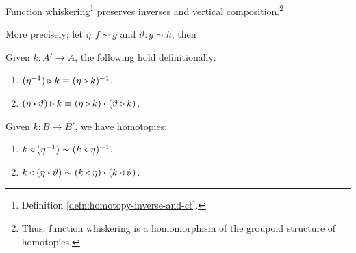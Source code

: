 \begin{prop}\label{prop:whiskering-distributivity}
    Function whiskering\footnote{Definition \ref{defn:homotopy-inverse-and-ct}.} preserves inverses and vertical composition.\footnote{Thus, function whiskering is a homomorphism of the groupoid structure of homotopies.}

    More precisely; let\/ $\eta\colon f\sim g$ and\/ $\vartheta\colon g\sim h$, then
    \begin{description}[font=\normalfont\scshape]
        \item[Right Whiskering:] Given\/ $k\colon A'\to A$, the following hold definitionally:
        \begin{enumerate}[-]
            \item $(\eta^{-1})\triangleright k\equiv(\eta\triangleright k)^{-1}$.
            \item $(\eta\mathbin{\boldsymbol{\cdot}}\vartheta)\triangleright k\equiv(\eta\triangleright k)\mathbin{\boldsymbol{\cdot}}(\vartheta\triangleright k)$.
        \end{enumerate}
        
        \item[Left Whiskering:] Given\/ $k\colon B\to B'$, we have homotopies:
        \begin{enumerate}[-]
            \item $k\triangleleft(\eta^{-1})\sim(k\triangleleft\eta)^{-1}$.
            \item $k\triangleleft(\eta\mathbin{\boldsymbol{\cdot}}\vartheta) \sim (k\triangleleft\eta)\mathbin{\boldsymbol{\cdot}}(k\triangleleft\vartheta)$.
        \end{enumerate}
    \end{description}
\end{prop}

